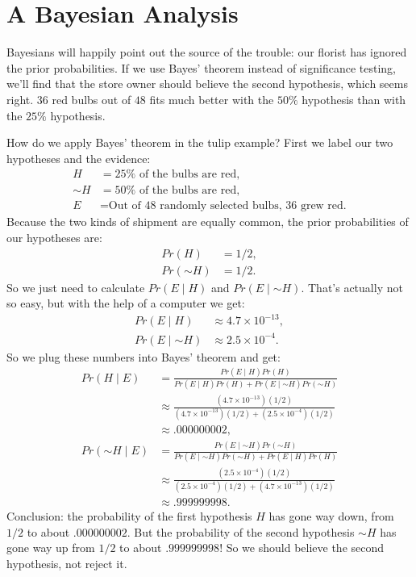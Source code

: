\documentclass[justified]{tufte-book}
\newcommand{\given}{\mid}
\renewcommand{\neg}{\mathbin{\sim}}
\newcommand{\p}{Pr}
\theoremstyle{definition}
\theoremstyle{definition}
\theoremstyle{definition}
\theoremstyle{definition}
\theoremstyle{remark}
\begin{document}
\hypertarget{a-bayesian-analysis}{%
\section{A Bayesian Analysis}\label{a-bayesian-analysis}}

Bayesians will happily point out the source of the trouble: our florist has ignored the prior probabilities. If we use Bayes' theorem instead of significance testing, we'll find that the store owner should believe the second hypothesis, which seems right. \(36\) red bulbs out of \(48\) fits much better with the \(50\%\) hypothesis than with the \(25\%\) hypothesis.

How do we apply Bayes' theorem in the tulip example? First we label our two hypotheses and the evidence:
\[
  \begin{aligned}
    H      &= \mbox{$25\%$ of the bulbs are red},\\
    \neg H &= \mbox{$50\%$ of the bulbs are red,}\\
    E      &= \mbox{Out of 48 randomly selected bulbs, 36 grew red.}
  \end{aligned}
\]
Because the two kinds of shipment are equally common, the prior probabilities of our hypotheses are:
\[
  \begin{aligned}
    \p(H) &= 1/2,\\
    \p(\neg H) &= 1/2.
  \end{aligned}
\]
So we just need to calculate \(\p(E \given H)\) and \(\p(E \given \neg H)\). That's actually not so easy, but with the help of a computer we get:
\[
  \begin{aligned}
    \p(E \given H) &\approx 4.7 \times 10^{-13},\\
    \p(E \given \neg H) &\approx 2.5 \times 10^{-4}.
  \end{aligned}
\]
So we plug these numbers into Bayes' theorem and get:
\[
  \begin{aligned}
    \p(H \given E) &= \frac{\p(E \given H)\p(H)}{\p(E \given H)\p(H) + \p(E \given \neg H)\p(\neg H)}\\
        &\approx \frac{(4.7 \times 10^{-13})(1/2)}{(4.7 \times 10^{-13})(1/2) + (2.5 \times 10^{-4})(1/2)}\\
        &\approx .000000002,\\
    \p(\neg H \given E) &= \frac{\p(E \given \neg H)\p(\neg H)}{\p(E \given \neg H)\p(\neg H) + \p(E \given H)\p(H)}\\
        &\approx \frac{(2.5 \times 10^{-4})(1/2)}{(2.5 \times 10^{-4})(1/2) + (4.7 \times 10^{-13})(1/2)}\\
        &\approx .999999998.
  \end{aligned}
\]
Conclusion: the probability of the first hypothesis \(H\) has gone way down, from \(1/2\) to about \(.000000002\). But the probability of the second hypothesis \(\neg H\) has gone way up from \(1/2\) to about \(.999999998\)! So we should believe the second hypothesis, not reject it.
\end{document}
